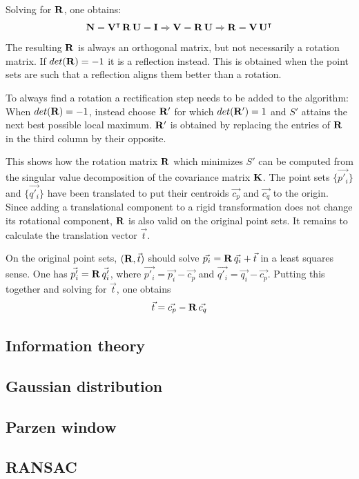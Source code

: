 Solving for $\mathbf{R}$, one obtains:
\begin{equation}
\mathbf{N} = \mathbf{V}^\intercal \, \mathbf{R} \, \mathbf{U} = \mathbf{I}
\Rightarrow \mathbf{V} = \mathbf{R} \, \mathbf{U}
\Rightarrow \mathbf{R} = \mathbf{V} \, \mathbf{U}^\intercal
\end{equation}
The resulting $\mathbf{R}$ is always an orthogonal matrix, but not necessarily a rotation matrix. If $det(\mathbf{R}) = -1$ it is a reflection instead. This is obtained when the point sets are such that a reflection aligns them better than a rotation.

To always find a rotation a rectification step needs to be added to the algorithm: When $det(\mathbf{R}) = -1$, instead choose $\mathbf{R'}$ for which $det(\mathbf{R'}) = 1$ and $S'$ attains the next best possible local maximum. $\mathbf{R'}$ is obtained by replacing the entries of $\mathbf{R}$ in the third column by their opposite.

This shows how the rotation matrix $\mathbf{R}$ which minimizes $S'$ can be computed from the singular value decomposition of the covariance matrix $\mathbf{K}$. The point sets $\{ \vec{p'_i} \}$ and $\{ \vec{q'_i} \}$ have been translated to put their centroids $\vec{c_p}$ and $\vec{c_q}$ to the origin. Since adding a translational component to a rigid transformation does not change its rotational component, $\mathbf{R}$ is also valid on the original point sets. It remains to calculate the translation vector $\vec{t}$.

On the original point sets, $(\mathbf{R}, \vec{t})$ should solve $\vec{p_i} = \mathbf{R} \, \vec{q_i} + \vec{t}$ in a least squares sense. One has $\vec{p'_i} = \mathbf{R} \, \vec{q'_i}$, where $\vec{p'_i} = \vec{p_i} - \vec{c_p}$ and $\vec{q'_i} = \vec{q_i} - \vec{c_p}$. Putting this together and solving for $\vec{t}$, one obtains
\begin{equation}
\vec{t} = \vec{c_p} - \mathbf{R} \, \vec{c_q}
\end{equation}


\subsection{Information theory}

\subsection{Gaussian distribution}

\subsection{Parzen window}

\subsection{RANSAC}

